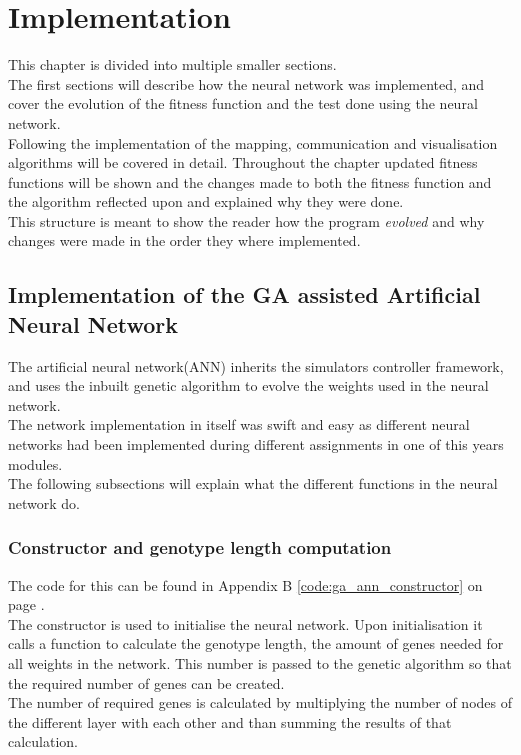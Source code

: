 \chapter{Implementation}
This chapter is divided into multiple smaller sections. \\
The first sections will describe how the neural network was implemented, and cover the evolution of the fitness function and the test done using the neural network. \\
Following the implementation of the mapping, communication and visualisation algorithms will be covered in detail. Throughout the chapter updated fitness functions will be shown and the changes made to both the fitness function and the algorithm reflected upon and explained why they were done. \\
This structure is meant to show the reader how the program \textit{evolved} and why changes were made in the order they where implemented. \\

\section{Implementation of the GA assisted Artificial Neural Network}
The artificial neural network(ANN) inherits the simulators controller framework, and uses the inbuilt genetic algorithm to evolve the weights used in the neural network.\\
The network implementation in itself was swift and easy as different neural networks had been implemented during different assignments in one of this years modules. \\
The following subsections will explain what the different functions in the neural network do.

\subsection{Constructor and genotype length computation}
\label{chap3:ga_ann_constructor}
The code for this can be found in Appendix B \ref{code:ga_ann_constructor} on page \pageref{code:ga_ann_constructor}.\\
The constructor is used to initialise the neural network. Upon initialisation it calls a function to calculate the genotype length, the amount of genes needed for all weights in the network. This number is passed to the genetic algorithm so that the required number of genes can be created.\\
The number of required genes is calculated by multiplying the number of nodes of the different layer with each other and than summing the results of that calculation. 


